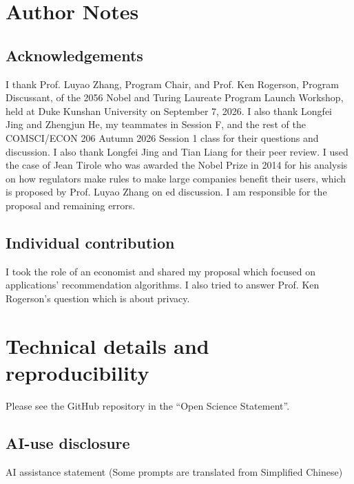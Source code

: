 \clearpage\nobalance
\section*{Author Notes}
\subsection*{Acknowledgements}
I thank Prof. Luyao Zhang, Program Chair, and Prof. Ken Rogerson, Program Discussant, of the 2056 Nobel and Turing Laureate Program Launch Workshop, held at Duke Kunshan University on September 7, 2026. I also thank Longfei Jing and Zhengjun He, my teammates in Session F, and the rest of the COMSCI/ECON 206 Autumn 2026 Session 1 class for their questions and discussion. I also thank Longfei Jing and Tian Liang for their peer review. I used the case of Jean Tirole who was awarded the Nobel Prize in 2014 for his analysis on how regulators make rules to make large companies benefit their users, which is proposed by Prof. Luyao Zhang on ed discussion. I am responsible for the proposal and remaining errors.

\subsection*{Individual contribution}
I took the role of an economist and shared my proposal which focused on applications’ recommendation algorithms. I also tried to answer Prof. Ken Rogerson’s question which is about privacy.


\nocite{nobel2014,wu2026,besbes2026,allcott2022,brady2021,zou2019,nash1950}

\appendix
\section{Technical details and reproducibility}
Please see the GitHub repository in the “Open Science Statement”.

\subsection{AI-use disclosure}
AI assistance statement (Some prompts are translated from Simplified Chinese)

